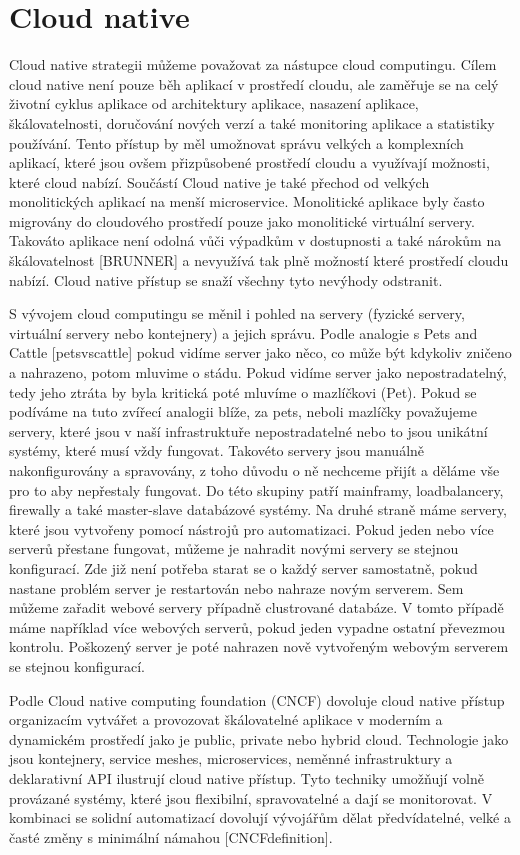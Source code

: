 \chapter{Cloud native}
Cloud native strategii můžeme považovat za nástupce cloud computingu. Cílem cloud native není pouze běh aplikací v prostředí cloudu, ale zaměřuje se na celý životní cyklus aplikace od architektury aplikace, nasazení aplikace, škálovatelnosti, doručování nových verzí a také monitoring aplikace a statistiky používání. Tento přístup by měl umožnovat správu velkých a komplexních aplikací, které jsou ovšem přizpůsobené prostředí cloudu a využívají možnosti, které cloud nabízí. Součástí Cloud native je také přechod od velkých monolitických aplikací na menší microservice. Monolitické aplikace byly často migrovány do cloudového prostředí pouze jako monolitické virtuální servery. Takováto aplikace není odolná vůči výpadkům v dostupnosti a  také nárokům na škálovatelnost [BRUNNER] a nevyužívá tak plně možností které prostředí cloudu nabízí. Cloud native přístup se snaží všechny tyto nevýhody odstranit. \par
    S vývojem cloud computingu se měnil i pohled na servery (fyzické servery, virtuální servery nebo kontejnery) a jejich správu. Podle analogie s Pets and Cattle [petsvscattle] pokud vidíme server jako něco, co může být kdykoliv zničeno a nahrazeno, potom mluvime o stádu. Pokud vidíme server jako nepostradatelný, tedy jeho ztráta by byla kritická poté mluvíme o mazlíčkovi (Pet). Pokud se podíváme na tuto zvířecí analogii blíže, za pets, neboli mazlíčky považujeme servery, které jsou v naší infrastruktuře nepostradatelné nebo to jsou unikátní systémy, které musí vždy fungovat. Takovéto servery jsou manuálně nakonfigurovány a spravovány, z toho důvodu o ně nechceme přijít a děláme vše pro to aby nepřestaly fungovat. Do této skupiny patří mainframy, loadbalancery, firewally a také master-slave databázové systémy.  Na druhé straně máme servery, které jsou vytvořeny pomocí nástrojů pro automatizaci. Pokud jeden nebo více serverů přestane fungovat, můžeme je nahradit novými servery se stejnou konfigurací. Zde již není potřeba starat se o každý server samostatně, pokud nastane problém server je restartován nebo nahraze novým serverem. Sem můžeme zařadit webové servery případně clustrované databáze. V tomto případě máme například více webových serverů, pokud jeden vypadne ostatní převezmou kontrolu. Poškozený server je poté nahrazen nově vytvořeným webovým serverem se stejnou konfigurací. \par
        Podle Cloud native computing foundation (CNCF) dovoluje cloud native přístup organizacím vytvářet a provozovat škálovatelné aplikace v moderním a dynamickém prostředí jako je public, private nebo hybrid cloud. Technologie jako jsou kontejnery, service meshes, microservices, neměnné infrastruktury a deklarativní API ilustrují cloud native přístup. Tyto techniky umožňují volně provázané systémy, které jsou flexibilní, spravovatelné a dají se monitorovat. V kombinaci se solidní automatizací dovolují vývojářům dělat předvídatelné, velké a časté změny s minimální námahou [CNCFdefinition]. \par
